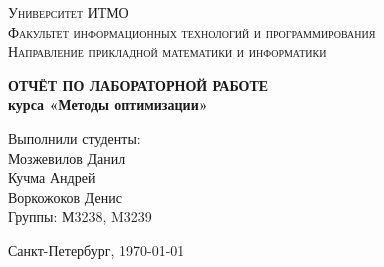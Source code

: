 \documentclass[14pt,a4paper,report]{ncc}
\begin{document}
\begin{titlepage}
\begin{center}
\textsc{Университет ИТМО\\[5mm]
Факультет информационных технологий и программирования\\[2mm]
Направление прикладной математики и информатики}

\vfill

\textbf{ОТЧЁТ ПО ЛАБОРАТОРНОЙ РАБОТЕ \\[3mm]
курса «Методы оптимизации»
\\[20mm]
}
\end{center}

\hfill
\begin{minipage}{.45\textwidth}
Выполнили студенты:\\[2mm]
Мозжевилов Данил\\
Кучма Андрей\\
Воркожоков Денис\\
Группы: М3238, M3239\\[2mm]

\end{minipage}%
\vfill
\begin{center}
 Санкт-Петербург, \today
\end{center}
\end{titlepage}

\tableofcontents
\newpage


\end{document}
